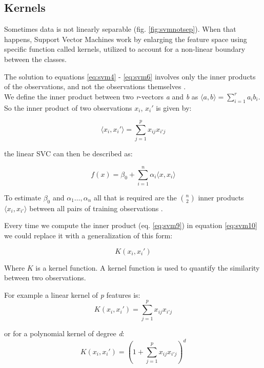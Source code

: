 \subsection{Kernels} \label{kernel}
Sometimes data is not linearly separable (fig. \ref{fig:svmnotsep}). When that happens, Support Vector Machines work by enlarging the feature space using specific function called kernels, utilized to account for a non-linear boundary between the classes.

The solution to equations \ref{eq:svm4} - \ref{eq:svm6} involves only the inner products of the observations, and not the observations themselves \cite{ISLR}.\\
We define the inner product between two \textit{r}-vectors \textit{a} and \textit{b} as $	\langle a,b \rangle = \sum_{i=1}^{r} a_{i}b_{i}$. So the inner product of two observations $x_i$, $x_i'$ is given by:

\begin{equation} \label{eq:svm9}
	\langle x_i, x_i' \rangle = \sum_{j=1}^{p} x_{ij}x_{i'j}
\end{equation}

the linear SVC can then be described as:

\begin{equation} \label{eq:svm10}
	f(x) = \beta_0 + \sum_{i=1}^{n} \alpha_i \langle x, x_i \rangle
\end{equation}

To estimate $\beta_{0}$ and $\alpha_1 \dots, \alpha_n$ all that is required are the $n \choose 2$ inner products $\langle x_i, x_{i'} \rangle$ between all pairs of training observations \cite{ISLR}.

Every time we compute the inner product (eq. \ref{eq:svm9}) in equation \ref{eq:svm10} we could replace it with a generalization of this form:

\begin{equation} \label{eq:svm11}
K(x_i, x_i')
\end{equation}

Where $K$ is a kernel function. A kernel function is used to quantify the similarity between two observations. 

For example a linear kernel of \textit{p} features is:
\begin{equation} \label{eq:svm12}
	K(x_i, x_i') = \sum_{j=1}^{p} x_{ij}x_{i'j}
\end{equation}

or for a polynomial kernel of degree \textit{d}:
\begin{equation} \label{eq:svm13}
	K(x_i, x_i') = (1 + \sum_{j=1}^{p} x_{ij}x_{i'j})^d
\end{equation}

